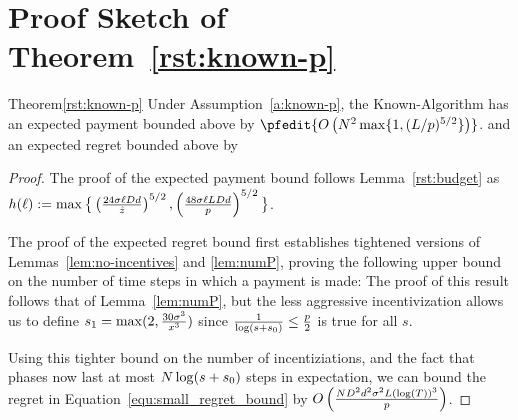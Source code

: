 \section{Proof Sketch of Theorem~\ref{rst:known-p}}
\label{sec:discussion-proof2}


\begin{rtheorem}{Theorem}{\ref{rst:known-p}}
Under Assumption~\ref{a:known-p}, the Known-\MinProb Algorithm has an expected payment bounded above by 
$\pfedit{O\left(N^2 \max\{1, (L/p)^{5/2}\}\right)}$.
and an expected regret bounded above by
\end{rtheorem}

\begin{proof}
	The proof of the expected payment bound follows Lemma~\ref{rst:budget} 
    as $h(\ell) := \max\big\{ \left(\frac{24\sigma \ell D d}{\hat{z}} \right)^{5/2},
        \left( \frac{48\sigma \ell L D d}{p} \right)^{5/2}\big\}$.


The proof of the expected regret bound first establishes tightened versions of Lemmas~\ref{lem:no-incentives} and \ref{lem:numP},
proving the following upper bound on the number of time steps in which a payment is made:
The proof of this result follows that of Lemma~\ref{lem:numP},
but the less aggressive incentivization allows us to define $s_1 = \max(2, \frac{30 \sigma^3}{x^3})$ since $\frac{1}{\log(s+s_0)} \leq \frac{p}{2}$ is true for all $s$.

Using this tighter bound on the number of incentiziations, and the fact that phases now last at most $N \log(s+s_0)$ steps in expectation, we can bound the regret in Equation~\ref{equ:small_regret_bound} by
$O\left(\frac{ND^2 d^2\sigma^2 L(\log(T))^3}{p}\right)$.
\end{proof}

